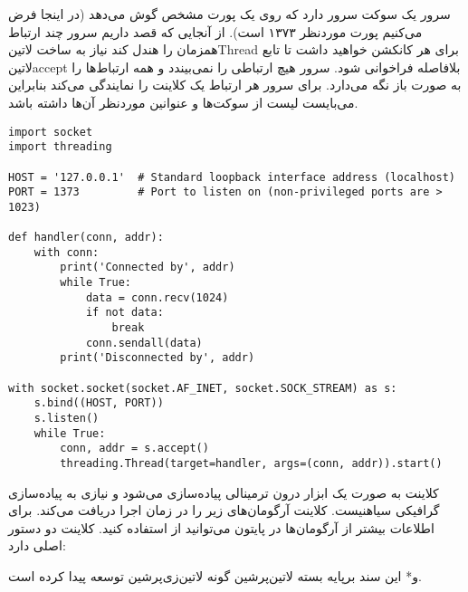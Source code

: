 \documentclass[]{article}
\begin{document}

  سرور یک سوکت سرور دارد که روی یک پورت مشخص گوش می‌دهد (در اینجا فرض می‌کنیم پورت موردنظر ۱۳۷۳ است). از آنجایی که قصد داریم سرور چند ارتباط همزمان را هندل کند نیاز به ساخت ‌لاتین{Thread} برای هر کانکشن خواهید داشت
  تا تابع ‌لاتین{accept} بلافاصله فراخوانی شود. سرور هیچ ارتباطی را نمی‌بیندد و همه ارتباط‌ها را به صورت باز نگه می‌دارد. برای سرور هر ارتباط یک کلاینت را نمایندگی می‌کند بنابراین می‌بایست لیست از سوکت‌ها و عنوانین موردنظر آن‌ها داشته باشد.

  \begin{latin}
  \begin{verbatim}
import socket
import threading

HOST = '127.0.0.1'  # Standard loopback interface address (localhost)
PORT = 1373         # Port to listen on (non-privileged ports are > 1023)

def handler(conn, addr):
    with conn:
        print('Connected by', addr)
        while True:
            data = conn.recv(1024)
            if not data:
                break
            conn.sendall(data)
        print('Disconnected by', addr)

with socket.socket(socket.AF_INET, socket.SOCK_STREAM) as s:
    s.bind((HOST, PORT))
    s.listen()
    while True:
        conn, addr = s.accept()
        threading.Thread(target=handler, args=(conn, addr)).start()
  \end{verbatim}
  \end{latin}


  کلاینت به صورت یک ابزار درون ترمینالی پیاده‌سازی می‌شود و نیازی به پیاده‌سازی گرافیکی ‌سیاه{نیست}.
  کلاینت آرگومان‌های زیر را در زمان اجرا دریافت می‌کند. برای اطلاعات بیشتر از آرگومان‌ها در پایتون می‌توانید از  استفاده کنید.
  کلاینت دو دستور اصلی دارد:

  ‌و*{}
این سند برپایه بسته ‌لاتین{‌پرشین} گونه ‌لاتین{‌زی‌پرشین} توسعه پیدا کرده است.
\end{document}
